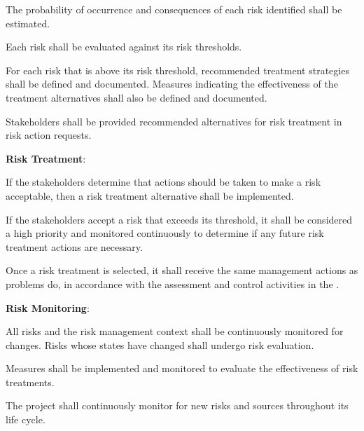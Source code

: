 \begin{adjustwidth}{2em}{0pt}
\begin{compactenum}
\begin{compactenum}
						\item The probability of occurrence and consequences of each risk identified shall be estimated.

						\item Each risk shall be evaluated against its risk thresholds.

						\item For each risk that is above its risk threshold, recommended treatment strategies shall be defined and documented. Measures indicating the effectiveness of the treatment alternatives shall also be defined and documented.

						\item Stakeholders shall be provided recommended alternatives for risk treatment in risk action requests.
					\end{compactenum}

					\item {\bf Risk Treatment}:

					\begin{compactenum}
						\item If the stakeholders determine that actions should be taken to make a risk acceptable, then a risk treatment alternative shall be implemented.

						\item If the stakeholders accept a risk that exceeds its threshold, it shall be considered a high priority and monitored continuously to determine if any future risk treatment actions are necessary.

						\item Once a risk treatment is selected, it shall receive the same management actions as problems do, in accordance with the assessment and control activities in the .
					\end{compactenum}

					\item {\bf Risk Monitoring}:

					\begin{compactenum}
						\item All risks and the risk management context shall be continuously monitored for changes. Risks whose states have changed shall undergo risk evaluation.

						\item Measures shall be implemented and monitored to evaluate the effectiveness of risk treatments.

						\item The project shall continuously monitor for new risks and sources throughout its life cycle.
					\end{compactenum}


\end{compactenum}
\end{adjustwidth}
